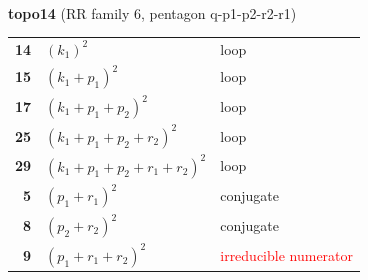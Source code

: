 \documentclass[10pt]{article}
\begin{document}
\begin{minipage}[t]{0.48\textwidth}
{}\\[2mm]\textbf{topo14} (RR family 6, pentagon q-p1-p2-r2-r1)\\[2pt]{\footnotesize\begin{tabular}{@{}r@{\ \ }l@{\ \ }l@{}}\textbf{14} & $(k_1)^2$ & loop\\
\textbf{15} & $(k_1+p_1)^2$ & loop\\
\textbf{17} & $(k_1+p_1+p_2)^2$ & loop\\
\textbf{25} & $(k_1+p_1+p_2+r_2)^2$ & loop\\
\textbf{29} & $(k_1+p_1+p_2+r_1+r_2)^2$ & loop\\
\textbf{5} & $(p_1+r_1)^2$ & conjugate\\
\textbf{8} & $(p_2+r_2)^2$ & conjugate\\
\textbf{9} & $(p_1+r_1+r_2)^2$ & \textcolor{red}{irreducible numerator}\\\end{tabular}}\end{minipage}

\bigskip
\end{document}
